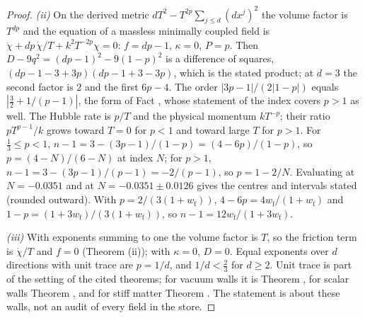 \begin{proof}
\emph{(ii)} On the derived metric $dT^{2} - T^{2p}\sum_{j \le d}(dx^{j})^{2}$ the volume factor is $T^{dp}$ and the equation of a massless minimally coupled field is $\ddot\chi + dp\,\dot\chi/T + k^{2}T^{-2p}\chi = 0$: $f = dp - 1$, $\kappa = 0$, $P = p$. Then $D - 9q^{2} = (dp - 1)^{2} - 9(1 - p)^{2}$ is a difference of squares, $(dp - 1 - 3 + 3p)(dp - 1 + 3 - 3p)$, which is the stated product; at $d = 3$ the second factor is $2$ and the first $6p - 4$. The order $|3p - 1|/(2|1 - p|)$ equals $|\tfrac32 + 1/(p - 1)|$, the form of Fact , whose statement of the index covers $p > 1$ as well. The Hubble rate is $p/T$ and the physical momentum $kT^{-p}$; their ratio $pT^{p - 1}/k$ grows toward $T = 0$ for $p < 1$ and toward large $T$ for $p > 1$. For $\tfrac13 \le p < 1$, $n - 1 = 3 - (3p - 1)/(1 - p) = (4 - 6p)/(1 - p)$, so $p = (4 - N)/(6 - N)$ at index $N$; for $p > 1$, $n - 1 = 3 - (3p - 1)/(p - 1) = -2/(p - 1)$, so $p = 1 - 2/N$. Evaluating at $N = -0.0351$ and at $N = -0.0351 \pm 0.0126$ gives the centres and intervals stated (rounded outward). With $p = 2/(3(1 + w_{\mathrm{f}}))$, $4 - 6p = 4w_{\mathrm{f}}/(1 + w_{\mathrm{f}})$ and $1 - p = (1 + 3w_{\mathrm{f}})/(3(1 + w_{\mathrm{f}}))$, so $n - 1 = 12w_{\mathrm{f}}/(1 + 3w_{\mathrm{f}})$.

\emph{(iii)} With exponents summing to one the volume factor is $T$, so the friction term is $\dot\chi/T$ and $f = 0$ (Theorem (ii)); with $\kappa = 0$, $D = 0$. Equal exponents over $d$ directions with unit trace are $p = 1/d$, and $1/d < \tfrac23$ for $d \ge 2$. Unit trace is part of the setting of the cited theorems; for vacuum walls it is Theorem , for scalar walls Theorem , and for stiff matter Theorem . The statement is about these walls, not an audit of every field in the store.


\end{proof}
